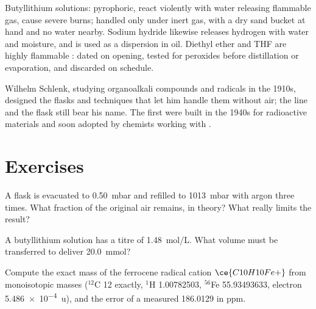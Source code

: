 \begin{safety}{}
Butyllithium solutions: pyrophoric, react violently with water releasing
flammable gas, cause severe burns; handled only under inert gas, with a dry
sand bucket at hand and no water nearby. Sodium hydride likewise releases
hydrogen with water and moisture, and is used as a dispersion in oil. Diethyl
ether and THF are highly flammable : dated on opening, tested for
peroxides before distillation or evaporation, and discarded on schedule.
\end{safety}

\begin{history}
Wilhelm Schlenk, studying organoalkali compounds and radicals in the 1910s,
designed the flasks and techniques that let him handle them without air; the
line and the flask still bear his name. The first  were built in the
1940s for radioactive materials and soon adopted by chemists working with
.
\end{history}

\section{Exercises}

\begin{exercise}[$\star$]\label{exo:b3:lab-techniques-3:1}
A flask is evacuated to \qty{0.50}{mbar} and refilled to \qty{1013}{mbar} with argon three times. What fraction of
the original air remains, in theory? What really limits the result?
\end{exercise}

\begin{exercise}[$\star$]\label{exo:b3:lab-techniques-3:2}
A butyllithium solution has a titre of \qty{1.48}{mol/L}. What volume must be transferred to deliver
\qty{20.0}{mmol}?
\end{exercise}

\begin{exercise}[$\star$]\label{exo:b3:lab-techniques-3:3}
Compute the exact mass of the ferrocene radical cation $\ce{C10H10Fe+}$ from monoisotopic masses
($^{12}$C 12 exactly, $^1$H 1.00782503, $^{56}$Fe 55.93493633, electron \qty{5.486e-4}{u}), and the error of a measured
186.0129 in ppm.
\end{exercise}

